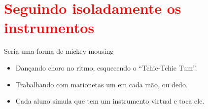 \newpage

\section{\textcolor{red}{Seguindo isoladamente os instrumentos}}
Seria uma forma de mickey mousing
\begin{itemize}
\item Dançando choro no ritmo, esquecendo o ``Tchic-Tchic Tum''.
\item Trabalhando com marionetas um em cada mão, ou dedo.
\item Cada aluno simula que tem um instrumento virtual e toca ele.
\end{itemize}
